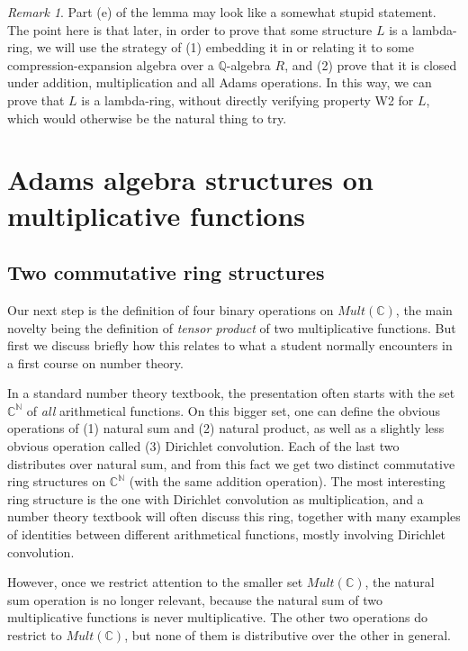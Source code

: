 \documentclass[a4paper]{article}
\theoremstyle{definition}
\theoremstyle{remark}
\newtheorem*{remark}{Remark}
\newcommand{\N}{\mathbb{N}}
\newcommand{\C}{\mathbb{C}}
\begin{document}
\begin{remark}
Part (e) of the lemma may look like a somewhat stupid statement. The point here is that later, in order to prove that some structure $L$ is a lambda-ring, we will use the strategy of (1) embedding it in or relating it to some compression-expansion algebra over a $\mathbb{Q}$-algebra $R$, and (2) prove that it is closed under addition, multiplication and all Adams operations. In this way, we can prove that $L$ is a lambda-ring, without directly verifying property W2 for $L$, which would otherwise be the natural thing to try.
\end{remark}

\section{Adams algebra structures on multiplicative functions}

\subsection{Two commutative ring structures}

Our next step is the definition of four binary operations on $Mult(\mathbb{C})$, the main novelty being the definition of \emph{tensor product} of two multiplicative functions. But first we discuss briefly how this relates to what a student normally encounters in a first course on number theory.

In a standard number theory textbook, the presentation often starts with the set $\C^{\N}$ of \emph{all} arithmetical functions. On this bigger set, one can define the obvious operations of (1) natural sum and (2) natural product, as well as a slightly less obvious operation called (3) Dirichlet convolution. Each of the last two distributes over natural sum, and from this fact we get two distinct commutative ring structures on $\C^{\N}$ (with the same addition operation). The most interesting ring structure is the one with Dirichlet convolution as multiplication, and a number theory textbook will often discuss this ring, together with many examples of identities between different arithmetical functions, mostly involving Dirichlet convolution.

However, once we restrict attention to the smaller set $Mult(\C)$, the natural sum operation is no longer relevant, because the natural sum of two multiplicative functions is never multiplicative. The other two operations do restrict to $Mult(\C)$, but none of them is distributive over the other in general. 
\end{document}
